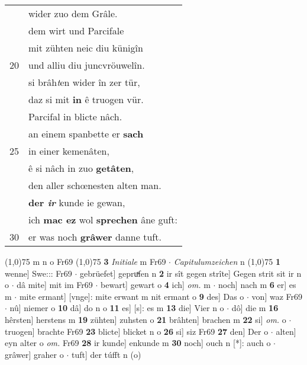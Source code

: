 \documentclass[8pt,a4paper,notitlepage]{article}
\begin{document}
\begin{table}[ht]
\begin{minipage}[t]{0.5\linewidth}
\begin{tabular}{rl}
 & wider zuo dem Grâle.\\ 
 & dem wirt und Parcifale\\ 
 & mit zühten neic diu künigîn\\ 
20 & und alliu diu juncvröuwelîn.\\ 
 & si brâh\textit{t}en wider în zer tür,\\ 
 & daz si mit \textbf{in} ê truogen vür.\\ 
 & Parcifal in blicte nâch.\\ 
 & an einem spanbette er \textbf{sach}\\ 
25 & in einer kemenâten,\\ 
 & ê si nâch in zuo \textbf{getâten},\\ 
 & den aller schœnesten alten man.\\ 
 & \textbf{der \textit{ir}} kunde ie gewan,\\ 
 & ich \textbf{mac ez} wol \textbf{sprechen} âne guft:\\ 
30 & er was noch \textbf{grâwer} danne tuft.\\ 
\end{tabular}
\scriptsize
\line(1,0){75} \newline
m n o Fr69 \newline
\line(1,0){75} \newline
\textbf{3} \textit{Initiale} m Fr69   $\cdot$ \textit{Capitulumzeichen} n  \newline
\line(1,0){75} \newline
\textbf{1} wenne] Swe::: Fr69  $\cdot$ gebrüefet] gepruͯfen n \textbf{2} ir sît gegen strîte] Gegen strit sit ir n o  $\cdot$ dâ mite] mit im Fr69  $\cdot$ bewart] gewart o \textbf{4} ich] \textit{om.} m  $\cdot$ noch] nach m \textbf{6} er] es m  $\cdot$ mite ermant] [vnge]: mite erwant m nit ermant o \textbf{9} des] Das o  $\cdot$ von] waz Fr69  $\cdot$ nû] niemer o \textbf{10} dâ] do n o \textbf{11} es] [s]: es m \textbf{13} die] Vier n o  $\cdot$ dô] die m \textbf{16} hêrsten] herstens m \textbf{19} zühten] zuhsten o \textbf{21} brâhten] brachen m \textbf{22} si] \textit{om.} o  $\cdot$ truogen] brachte Fr69 \textbf{23} blicte] blicket n o \textbf{26} si] siz Fr69 \textbf{27} den] Der o  $\cdot$ alten] eyn alter o \textit{om.} Fr69 \textbf{28} ir kunde] enkunde m \textbf{30} noch] ouch n [*]: auch o  $\cdot$ grâwer] graher o  $\cdot$ tuft] der túfft n (o) \newline
\end{minipage}
\end{table}
\newpage
\end{document}
